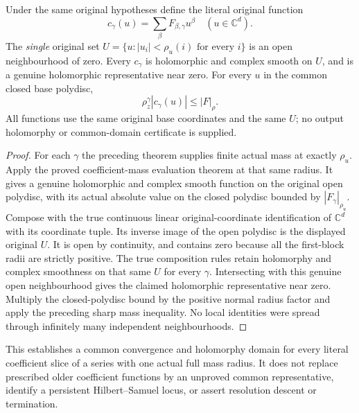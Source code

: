 \begin{theorem}
\label{hir:actual-relative-coefficient-common-polydisc-functions}
\leanok
Under the same original hypotheses define the literal original function
\[
 c_\gamma(u)=\sum_\beta F_{\beta,\gamma}u^\beta
 \quad(u\in\mathbb C^d).
\]
The \emph{single} original set
$U=\{u:|u_i|<\rho_u(i)\text{ for every }i\}$ is an open neighbourhood
of zero. Every $c_\gamma$ is holomorphic and complex smooth on $U$,
and is a genuine holomorphic representative near zero. For every
$u$ in the common closed base polydisc,
\[
 \rho_z^\gamma |c_\gamma(u)|\leq |F|_\rho.
\]
All functions use the same original base coordinates and the same $U$;
no output holomorphy or common-domain certificate is supplied.
\end{theorem}
\begin{proof}
For each $\gamma$ the preceding theorem supplies finite actual mass at
exactly $\rho_u$. Apply the proved coefficient-mass evaluation theorem
at that same radius. It gives a genuine holomorphic and complex smooth
function on the original open polydisc, with its actual absolute value
on the closed polydisc bounded by $|F_\gamma|_{\rho_u}$. Compose with
the true continuous linear original-coordinate identification of
$\mathbb C^d$ with its coordinate tuple. Its inverse image of the open
polydisc is the displayed original $U$. It is open by continuity, and
contains zero because all the first-block radii are strictly positive.
The true composition rules retain holomorphy and complex smoothness on
that same $U$ for every $\gamma$. Intersecting with this genuine open
neighbourhood gives the claimed holomorphic representative near zero.
Multiply the closed-polydisc bound by the positive normal radius factor
and apply the preceding sharp mass inequality. No local identities were
spread through infinitely many independent neighbourhoods.
\end{proof}

This establishes a common convergence and holomorphy domain for every
literal coefficient slice of a series with one actual full mass radius.
It does not replace prescribed older coefficient functions by an
unproved common representative, identify a persistent Hilbert--Samuel
locus, or assert resolution descent or termination.
